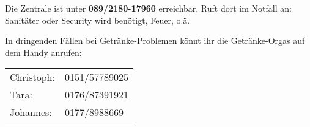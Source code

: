 Die Zentrale ist unter \textbf{089/2180-17960} erreichbar. Ruft dort im Notfall an: Sanitäter oder Security wird benötigt, Feuer, o.ä.

In dringenden Fällen bei Getränke-Problemen könnt ihr die Getränke-Orgas auf dem Handy anrufen:

\vspace{0.5cm}
\begin{tabular}{ll}
    Christoph: & 0151/57789025 \\
    Tara: & 0176/87391921 \\
    Johannes: & 0177/8988669
\end{tabular}
